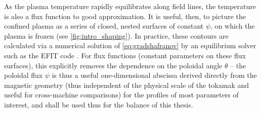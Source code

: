 \begin{figure}
 \pushtooutside
\end{figure}

\noindent As the plasma temperature rapidly equilibrates along field lines, the temperature is also a flux function to good approximation.  It is useful, then, to picture the confined plasma as a series of closed, nested surfaces of constant $\psi$, on which the plasma is frozen (see \cref{fig:intro_shaping}).  In practice, these contours are calculated via a numerical solution of \cref{eq:gradshafranov} by an equilibrium solver such as the EFIT code \cite{Lao1985}.  For flux functions (\ie constant parameters on these flux surfaces), this explicitly removes the dependence on the poloidal angle $\theta$ -- the poloidal flux $\psi$ is thus a useful one-dimensional abscissa derived directly from the magnetic geometry (thus independent of the physical scale of the tokamak and useful for cross-machine comparisons) for the profiles of most parameters of interest, and shall be used thus for the balance of this thesis.

